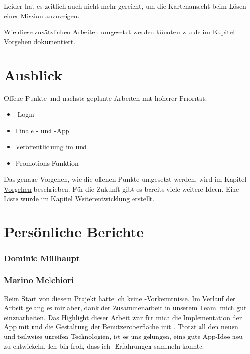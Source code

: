 Leider hat es zeitlich auch nicht mehr gereicht, um die Kartenansicht beim Lösen einer Mission anzuzeigen.

Wie diese zusätzlichen Arbeiten umgesetzt werden könnten wurde im Kapitel \hyperref[pd-weiterentwicklung-vorgehen]{Vorgehen} dokumentiert.

\section{Ausblick}
Offene Punkte und nächste geplante Arbeiten mit höherer Priorität:

\begin{itemize}
	\item {}-Login
	\item Finale - und -App
	\item Veröffentlichung im  und  
	\item Promotions-Funktion
\end{itemize}

Das genaue Vorgehen, wie die offenen Punkte umgesetzt werden, wird im Kapitel \hyperref[pd-weiterentwicklung-vorgehen]{Vorgehen} beschrieben.
Für die Zukunft gibt es bereits viele weitere Ideen. 
Eine Liste wurde im Kapitel \hyperref[pd-weiterentwicklung-realistisch]{Weiterentwicklung} erstellt. 

\section{Persönliche Berichte}

\subsubsection{Dominic Mülhaupt}

\subsubsection{Marino Melchiori}
Beim Start von diesem Projekt hatte ich keine -Vorkenntnisse.
Im Verlauf der Arbeit gelang es mir aber, dank der Zusammenarbeit in unserem Team, mich gut  einzuarbeiten.
Das Highlight dieser Arbeit war für mich die Implementation der App mit  und die Gestaltung der Benutzeroberfläche mit .
Trotzt all den neuen und teilweise unreifen Technologien, ist es uns gelungen, eine gute App-Idee neu zu entwickeln.
Ich bin froh, dass ich -Erfahrungen sammeln konnte.